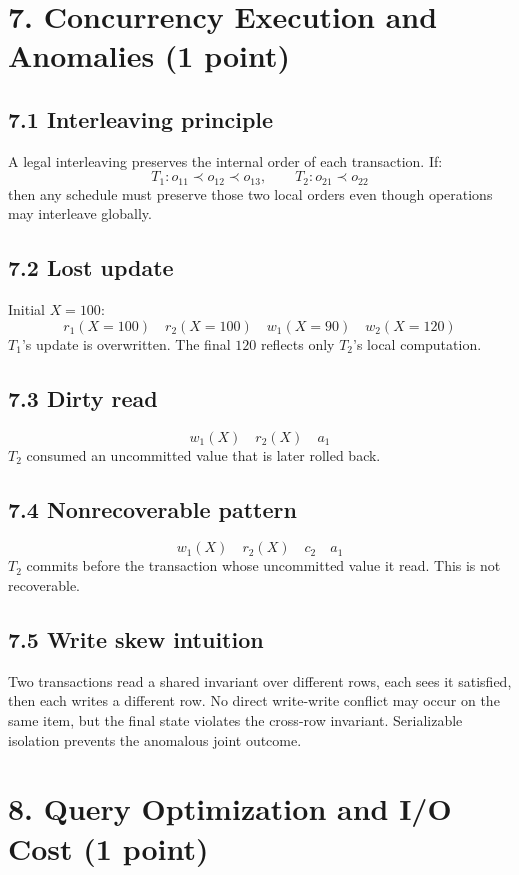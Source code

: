 \documentclass[10pt,a4paper]{article}
\begin{document}
\section{7. Concurrency Execution and Anomalies (1 point)}

\subsection{7.1 Interleaving principle}
A legal interleaving preserves the internal order of each transaction.
If:
\[
T_1:o_{11}\prec o_{12}\prec o_{13},\qquad T_2:o_{21}\prec o_{22}
\]
then any schedule must preserve those two local orders even though operations may interleave globally.

\subsection{7.2 Lost update}
Initial $X=100$:
\[
r_1(X=100)\quad r_2(X=100)\quad w_1(X=90)\quad w_2(X=120)
\]
$T_1$'s update is overwritten. The final $120$ reflects only $T_2$'s local computation.

\subsection{7.3 Dirty read}
\[
w_1(X)\quad r_2(X)\quad a_1
\]
$T_2$ consumed an uncommitted value that is later rolled back.

\subsection{7.4 Nonrecoverable pattern}
\[
w_1(X)\quad r_2(X)\quad c_2\quad a_1
\]
$T_2$ commits before the transaction whose uncommitted value it read. This is not recoverable.

\subsection{7.5 Write skew intuition}
Two transactions read a shared invariant over different rows, each sees it satisfied, then each writes a different row. No direct write-write conflict may occur on the same item, but the final state violates the cross-row invariant. Serializable isolation prevents the anomalous joint outcome.

\section{8. Query Optimization and I/O Cost (1 point)}
\end{document}
